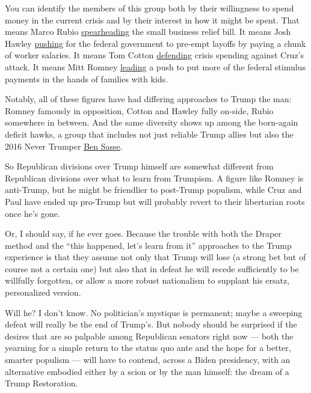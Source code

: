 You can identify the members of this group both by their willingness to
spend money in the current crisis and by their interest in how it might
be spent. That means Marco Rubio
\href{https://www.rubio.senate.gov/public/index.cfm/2020/7/rubio-collins-introduce-phase-iv-small-business-relief-package}{spearheading}
the small business relief bill. It means Josh Hawley
\href{https://www.hawley.senate.gov/sites/default/files/2020-04/Getting-America-Back-to-Work_0.pdf}{pushing}
for the federal government to pre-empt layoffs by paying a chunk of
worker salaries. It means Tom Cotton
\href{https://www.washingtonpost.com/politics/2020/07/22/daily-202-cruz-vs-cotton-clash-coronavirus-deficits-may-preview-2024-contest-post-trump-gop/}{defending}
crisis spending against Cruz's attack. It means Mitt Romney
\href{https://www.romney.senate.gov/romney-cassidy-daines-rubio-call-family-focused-economic-impact-payments-coronavirus-relief}{leading}
a push to put more of the federal stimulus payments in the hands of
families with kids.

Notably, all of these figures have had differing approaches to Trump the
man: Romney famously in opposition, Cotton and Hawley fully on-side,
Rubio somewhere in between. And the same diversity shows up among the
born-again deficit hawks, a group that includes not just reliable Trump
allies but also the 2016 Never Trumper
\href{https://www.sasse.senate.gov/public/index.cfm/2020/7/sasse-statement-on-intra-democratic-mnuchin-pelosi-negotiations}{Ben
Sasse}.

So Republican divisions over Trump himself are somewhat different from
Republican divisions over what to learn from Trumpism. A figure like
Romney is anti-Trump, but he might be friendlier to post-Trump populism,
while Cruz and Paul have ended up pro-Trump but will probably revert to
their libertarian roots once he's gone.

Or, I should say, if he ever goes. Because the trouble with both the
Draper method and the ``this happened, let's learn from it'' approaches
to the Trump experience is that they assume not only that Trump will
lose (a strong bet but of course not a certain one) but also that in
defeat he will recede sufficiently to be willfully forgotten, or allow a
more robust nationalism to supplant his ersatz, personalized version.

Will he? I don't know. No politician's mystique is permanent; maybe a
sweeping defeat will really be the end of Trump's. But nobody should be
surprised if the desires that are so palpable among Republican senators
right now --- both the yearning for a simple return to the status quo
ante and the hope for a better, smarter populism --- will have to
contend, across a Biden presidency, with an alternative embodied either
by a scion or by the man himself: the dream of a Trump Restoration.

